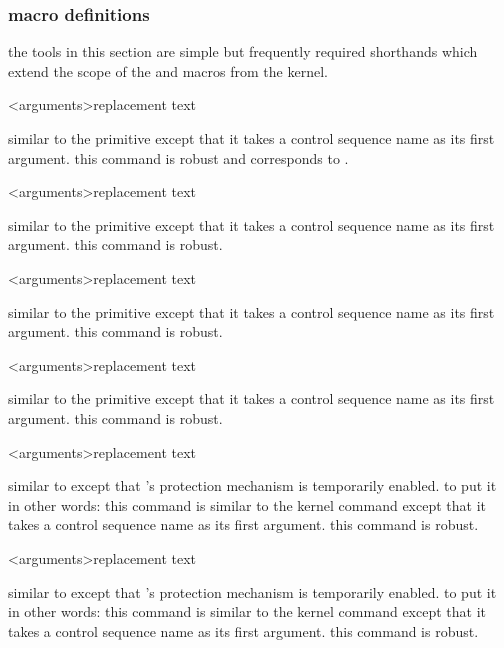 \subsubsection{macro definitions}
\label{aut:def:def}

the tools in this section are simple but frequently required shorthands which extend the scope of the  and  macros from the \latex kernel.

\begin{ltxsyntax}

<arguments>{replacement text}

similar to the \tex primitive  except that it takes a control sequence name as its first argument. this command is robust and corresponds to .

<arguments>{replacement text}

similar to the \tex primitive  except that it takes a control sequence name as its first argument. this command is robust.

<arguments>{replacement text}

similar to the \tex primitive  except that it takes a control sequence name as its first argument. this command is robust.

<arguments>{replacement text}

similar to the \tex primitive  except that it takes a control sequence name as its first argument. this command is robust.

<arguments>{replacement text}

similar to  except that \latex's protection mechanism is temporarily enabled. to put it in other words: this command is similar to the \latex kernel command  except that it takes a control sequence name as its first argument. this command is robust.

<arguments>{replacement text}

similar to  except that \latex's protection mechanism is temporarily enabled. to put it in other words: this command is similar to the \latex kernel command  except that it takes a control sequence name as its first argument. this command is robust.



\end{ltxsyntax}
